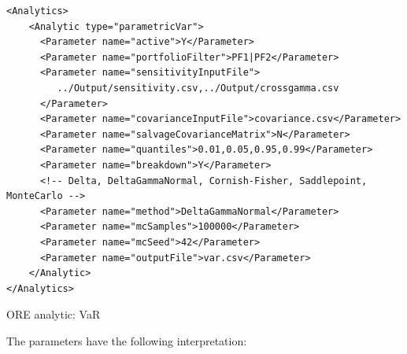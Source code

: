 \documentclass[12pt, a4paper]{article}
\begin{document}
\begin{listing}[H]
\begin{verbatim}
<Analytics>
    <Analytic type="parametricVar"> 
      <Parameter name="active">Y</Parameter> 
      <Parameter name="portfolioFilter">PF1|PF2</Parameter>
      <Parameter name="sensitivityInputFile">
         ../Output/sensitivity.csv,../Output/crossgamma.csv
      </Parameter> 
      <Parameter name="covarianceInputFile">covariance.csv</Parameter> 
      <Parameter name="salvageCovarianceMatrix">N</Parameter>
      <Parameter name="quantiles">0.01,0.05,0.95,0.99</Parameter> 
      <Parameter name="breakdown">Y</Parameter> 
      <!-- Delta, DeltaGammaNormal, Cornish-Fisher, Saddlepoint, MonteCarlo --> 
      <Parameter name="method">DeltaGammaNormal</Parameter> 
      <Parameter name="mcSamples">100000</Parameter> 
      <Parameter name="mcSeed">42</Parameter> 
      <Parameter name="outputFile">var.csv</Parameter> 
    </Analytic> 
</Analytics>
\end{verbatim}
\caption{ORE analytic: VaR}
\label{lst:ore_var}
\end{listing}

The parameters have the following interpretation:
\end{document}
